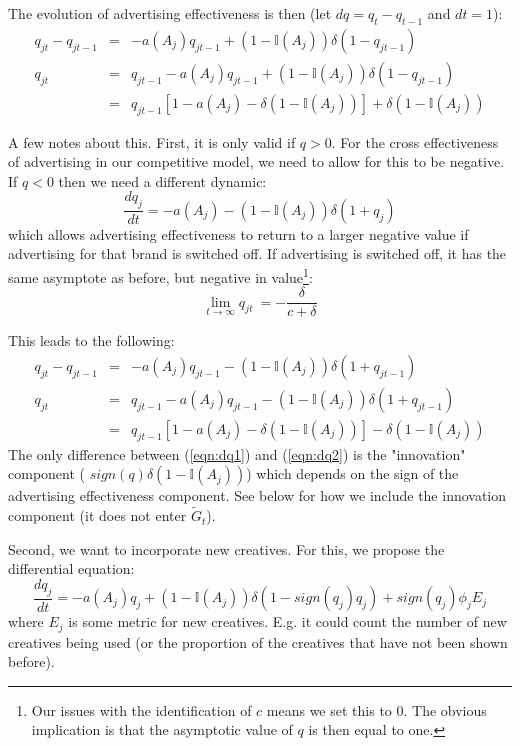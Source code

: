 \documentclass[letter,10pt]{article}
\newcommand{\Igtz}{\mathbb{I}}
\begin{document}
The evolution of advertising effectiveness is then (let $dq = q_t - q_{t-1}$ and $dt=1$):
\begin{eqnarray}
q_{jt} - q_{jt-1} & = & -a(A_j) q_{jt-1} + (1-\Igtz(A_j))\delta (1- q_{jt-1})\nonumber\\
q_{jt} & = & q_{jt-1} -a(A_j) q_{jt-1} + (1-\Igtz(A_j))\delta (1- q_{jt-1})\nonumber\\
& = & q_{jt-1} \left[1-a(A_j) -\delta (1-\Igtz(A_j))\right]  + \delta (1- \Igtz(A_j))
\label{eqn:dq1}
\end{eqnarray}

A few notes about this.  First, it is only valid if $q>0$. For the cross effectiveness of 
advertising in our competitive model, we need to allow for this to be negative.  If $q<0$ then we need a different
dynamic:
\[
\frac{dq_j}{dt} = -a(A_j) - (1-\Igtz(A_j)) \delta (1 + q_j) 
\]
which allows advertising effectiveness to return to a larger negative value if advertising for
that brand is switched off.  If advertising is switched off, it has the same asymptote as before, 
but negative in value\footnote{\baselineskip 12pt Our issues with the identification of $c$ 
means we set this to $0$.  The obvious implication is that the asymptotic value of $q$ is then 
equal to one.}:
\[
\lim_{t \rightarrow \infty} q_{jt} ~=  -\frac{\delta}{c+\delta}
\]

This leads to the following:
\begin{eqnarray}
q_{jt} - q_{jt-1} & = & -a(A_j) q_{jt-1} - (1-\Igtz(A_j))\delta (1+ q_{jt-1})\nonumber\\
q_{jt} & = & q_{jt-1} -a(A_j) q_{jt-1} - (1-\Igtz(A_j))\delta (1+ q_{jt-1})\nonumber\\
& = & q_{jt-1} \left[1-a(A_j) -\delta (1-\Igtz(A_j))\right]  - \delta (1- \Igtz(A_j))
\label{eqn:dq2}
\end{eqnarray}
The only difference between (\ref{eqn:dq1}) and (\ref{eqn:dq2}) is the "innovation" component ( $sign(q) \delta(1-\Igtz(A_j))$)
which depends on the sign of the advertising effectiveness component.  See below for how
we include the innovation component (it does not enter $\tilde{G}_t$).

Second, we want to incorporate new creatives.  For this, we propose the differential equation:
\[
\frac{dq_j}{dt} = -a(A_j)q_j +(1-\Igtz(A_j)) \delta (1 - sign(q_j) q_j) + sign(q_j) \phi_j E_j
\]
where $E_j$ is some metric for new creatives.  E.g. it could count the number of new
creatives being used (or the proportion of the creatives that have not been shown before).  
\end{document}
